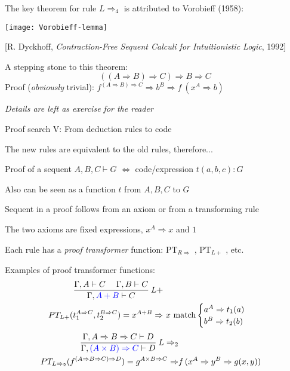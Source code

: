 The key theorem for rule $L\Rightarrow_{4}$ is attributed to Vorobieff
(1958):
\begin{center}
\texttt{[image: Vorobieff-lemma]}
\par\end{center}

\begin{center}
{\footnotesize{}{[}R. Dyckhoff, }\emph{\footnotesize{}Contraction-Free
Sequent Calculi for Intuitionistic Logic}{\footnotesize{}, 1992{]}}{\footnotesize\par}
\par\end{center}

A stepping stone to this theorem:{\footnotesize{}
\[
\left(\left(A\Rightarrow B\right)\Rightarrow C\right)\Rightarrow B\Rightarrow C
\]
}Proof (\emph{obviously} trivial): $f^{\left(A\Rightarrow B\right)\Rightarrow C}\Rightarrow b^{B}\Rightarrow f\:(x^{A}\Rightarrow b)$

\emph{Details are left as exercise for the reader}

Proof search V: From deduction rules to code

The new rules are equivalent to the old rules, therefore...

Proof of a sequent $A,B,C\vdash G$ $\Leftrightarrow$ code/expression
$t(a,b,c):G$

Also can be seen as a function $t$ from $A,B,C$ to $G$

Sequent in a proof follows from an axiom or from a transforming rule

The two axioms are fixed expressions, $x^{A}\Rightarrow x$ and $1$

Each rule has a \emph{proof transformer} function: $\text{PT}_{R\Rightarrow}$
, $\text{PT}_{L+}$ , etc.

Examples of proof transformer functions:
\begin{align*}
\frac{\Gamma,A\vdash C\quad\;\Gamma,B\vdash C}{\Gamma,{\color{blue}A+B}\vdash C}\:L+\\
PT_{L+}(t_{1}^{A\Rightarrow C},t_{2}^{B\Rightarrow C})=x^{A+B}\Rightarrow & \ x\ \text{match}\begin{cases}
a^{A}\Rightarrow t_{1}(a)\\
b^{B}\Rightarrow t_{2}(b)
\end{cases}
\end{align*}
\begin{align*}
\frac{\Gamma,A\Rightarrow B\Rightarrow C\vdash D}{\Gamma,{\color{blue}(A\times B)\Rightarrow C}\vdash D}\:L\Rightarrow_{2}\\
PT_{L\Rightarrow_{2}}(f^{\left(A\Rightarrow B\Rightarrow C\right)\Rightarrow D})=g^{A\times B\Rightarrow C}\Rightarrow & f\,(x^{A}\Rightarrow y^{B}\Rightarrow g(x,y))
\end{align*}

